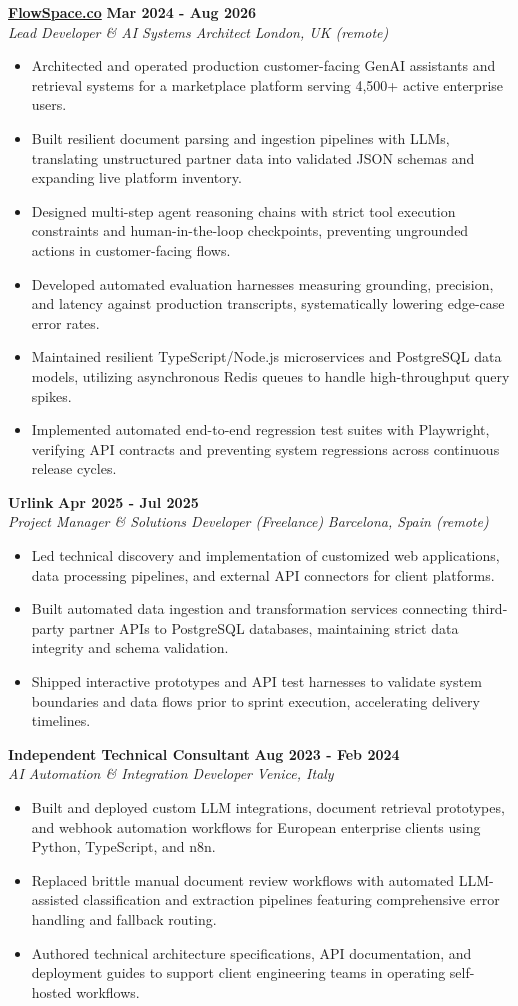 \documentclass[10pt,a4paper]{article}
\newcommand{\role}[4]{%
  \textbf{#1} \hfill \textbf{#2}\\[1pt]%
  \textit{#3} \hfill \textit{#4}\\[2pt]%
}
\begin{document}
\role{\href{https://flowspace.co}{FlowSpace.co}}{Mar 2024 - Aug 2026}{Lead Developer \& AI Systems Architect}{London, UK (remote)}
\begin{itemize}
  \item Architected and operated production customer-facing GenAI assistants and retrieval systems for a marketplace platform serving 4,500+ active enterprise users.
  \item Built resilient document parsing and ingestion pipelines with LLMs, translating unstructured partner data into validated JSON schemas and expanding live platform inventory.
  \item Designed multi-step agent reasoning chains with strict tool execution constraints and human-in-the-loop checkpoints, preventing ungrounded actions in customer-facing flows.
  \item Developed automated evaluation harnesses measuring grounding, precision, and latency against production transcripts, systematically lowering edge-case error rates.
  \item Maintained resilient TypeScript/Node.js microservices and PostgreSQL data models, utilizing asynchronous Redis queues to handle high-throughput query spikes.
  \item Implemented automated end-to-end regression test suites with Playwright, verifying API contracts and preventing system regressions across continuous release cycles.
\end{itemize}

\role{Urlink}{Apr 2025 - Jul 2025}{Project Manager \& Solutions Developer (Freelance)}{Barcelona, Spain (remote)}
\begin{itemize}
  \item Led technical discovery and implementation of customized web applications, data processing pipelines, and external API connectors for client platforms.
  \item Built automated data ingestion and transformation services connecting third-party partner APIs to PostgreSQL databases, maintaining strict data integrity and schema validation.
  \item Shipped interactive prototypes and API test harnesses to validate system boundaries and data flows prior to sprint execution, accelerating delivery timelines.
\end{itemize}

\role{Independent Technical Consultant}{Aug 2023 - Feb 2024}{AI Automation \& Integration Developer}{Venice, Italy}
\begin{itemize}
  \item Built and deployed custom LLM integrations, document retrieval prototypes, and webhook automation workflows for European enterprise clients using Python, TypeScript, and n8n.
  \item Replaced brittle manual document review workflows with automated LLM-assisted classification and extraction pipelines featuring comprehensive error handling and fallback routing.
  \item Authored technical architecture specifications, API documentation, and deployment guides to support client engineering teams in operating self-hosted workflows.
\end{itemize}
\end{document}
